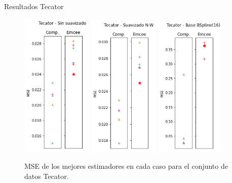 \documentclass[10pt, professionalfonts]{beamer}
\begin{document}

\begin{frame}{Resultados Tecator}
  \begin{figure}
    \includegraphics[width=0.3\textwidth]{img/results-new/reg_tecator_none}\hfill
    \includegraphics[width=0.3\textwidth]{img/results-new/reg_tecator_nw}\hfill
    \includegraphics[width=0.3\textwidth]{img/results-new/reg_tecator_basis}
    \caption{MSE de los mejores estimadores en cada caso para el conjunto de datos Tecator.}
  \end{figure}
\end{frame}
\end{document}
